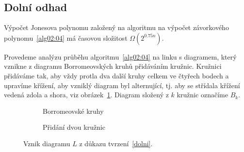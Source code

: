 \subsection{Dolní odhad}

\begin{tvrz} \label{dolni}
Výpočet Jonesova polynomu založený na algoritmu na výpočet závorkového polynomu~\ref{alg02:04} má časovou složitost  $\Omega(2^{0.75 n})$.
\end{tvrz}

\begin{dukaz}
Provedeme analýzu průběhu algoritmu~\ref{alg02:04} na linku s diagramem, který vznikne z diagramu Borromeovských kruhů přidáváním kružnic. Kružnici přidáváme tak, aby vždy protla dva další kruhy celkem ve čtyřech bodech a upravíme křížení, aby vzniklý diagram byl alternující, tj. aby se střídala křížení vedená zdola a shora, viz obrázek~\ref{borro}. Diagram složený z $k$ kružnic označíme $B_k$.

\begin{figure}[h]  

\centering 
\begin{subfigure}[t]{0.4\linewidth}\centering
{} 
\caption{Borromeovské kruhy} 
\end{subfigure}
\begin{subfigure}[t]{0.4\linewidth}\centering
{}
\caption{Přidání dvou kružnic}
\end{subfigure}
\caption{Vznik diagramu $L$ z důkazu tvrzení~\ref{dolni}.} \label{borro}
\end{figure}  



\end{dukaz}
